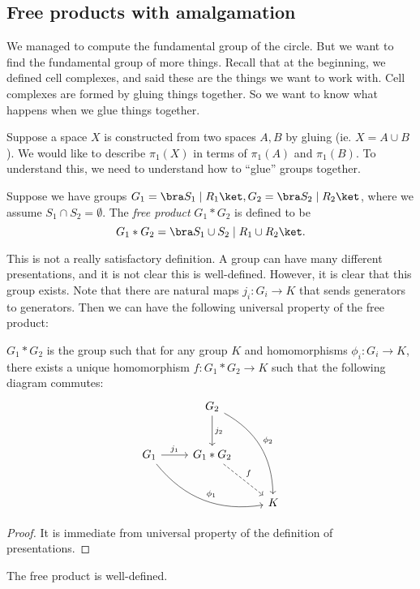\documentclass[a4paper]{article}
\begin{document}
\subsection{Free products with amalgamation}
We managed to compute the fundamental group of the circle. But we want to find the fundamental group of more things. Recall that at the beginning, we defined cell complexes, and said these are the things we want to work with. Cell complexes are formed by gluing things together. So we want to know what happens when we glue things together.

Suppose a space $X$ is constructed from two spaces $A, B$ by gluing (ie. $X = A\cup B$). We would like to describe $\pi_1(X)$ in terms of $\pi_1(A)$ and $\pi_1(B)$. To understand this, we need to understand how to ``glue'' groups together.

\begin{defi}
  Suppose we have groups $G_1 = \bra S_1 \mid R_1\ket, G_2 = \bra S_2 \mid R_2\ket$, where we assume $S_1 \cap S_2 = \emptyset$. The \emph{free product} $G_1 * G_2$ is defined to be
  \[
    G_1 * G_2 = \bra S_1 \cup S_2 \mid R_1 \cup R_2\ket.
  \]
\end{defi}
This is not a really satisfactory definition. A group can have many different presentations, and it is not clear this is well-defined. However, it is clear that this group exists. Note that there are natural maps $j_i: G_i \to K$ that sends generators to generators. Then we can have the following universal property of the free product:

\begin{lemma}
  $G_1 * G_2$ is the group such that for any group $K$ and homomorphisms $\phi_i: G_i \to K$, there exists a unique homomorphism $f: G_1 * G_2 \to K$ such that the following diagram commutes:
  \[
    \begin{tikzcd}[row sep=large]
      & G_2 \ar[rdd, bend left, "\phi_2"] \ar[d, "j_2"]\\
      G_1 \ar[rrd, bend right, "\phi_1"] \ar [r, "j_1"] & G_1 * G_2 \ar [rd, dashed, "f"]\\
      && K
    \end{tikzcd}
  \]
\end{lemma}

\begin{proof}
  It is immediate from universal property of the definition of presentations.
\end{proof}

\begin{cor}
  The free product is well-defined.
\end{cor}
\end{document}
